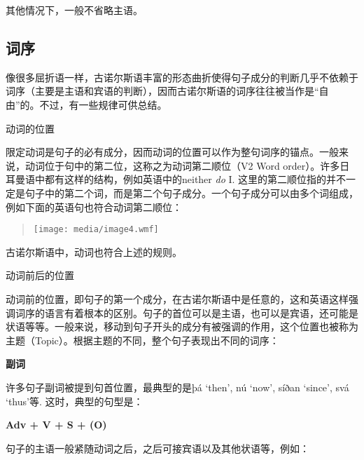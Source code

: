 其他情况下，一般不省略主语。

\subsection{词序}\label{ux8bcdux5e8f}

像很多屈折语一样，古诺尔斯语丰富的形态曲折使得句子成分的判断几乎不依赖于词序（主要是主语和宾语的判断），因而古诺尔斯语的词序往往被当作是``自由''的。不过，有一些规律可供总结。

动词的位置

限定动词是句子的必有成分，因而动词的位置可以作为整句词序的锚点。一般来说，动词位于句中的第二位，这称之为动词第二顺位（V2
Word order）。许多日耳曼语中都有这样的结构，例如英语中的neither
\emph{do} I.
这里的第二顺位指的并不一定是句子中的第二个词，而是第二个句子成分。一个句子成分可以由多个词组成，例如下面的英语句也符合动词第二顺位：

\begin{quote}
\texttt{[image: media/image4.wmf]}
\end{quote}

古诺尔斯语中，动词也符合上述的规则。

动词前后的位置

动词前的位置，即句子的第一个成分，在古诺尔斯语中是任意的，这和英语这样强调词序的语言有着根本的区别。句子的首位可以是主语，也可以是宾语，还可能是状语等等。一般来说，移动到句子开头的成分有被强调的作用，这个位置也被称为主题（Topic）。根据主题的不同，整个句子表现出不同的词序：

\textbf{副词}

许多句子副词被提到句首位置，最典型的是þá `then', nú `now', síðan
`since', svá `thus'等. 这时，典型的句型是：

\textbf{Adv + V + S + (O)}

句子的主语一般紧随动词之后，之后可接宾语以及其他状语等，例如：

